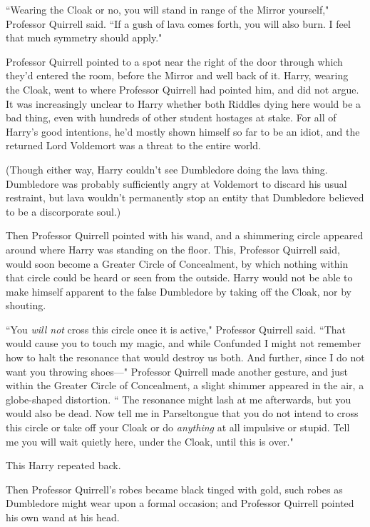 ``Wearing the Cloak or no, you will stand in range of the Mirror yourself," Professor Quirrell said. ``If a gush of lava comes forth, you will also burn. I feel that much symmetry should apply."

Professor Quirrell pointed to a spot near the right of the door through which they'd entered the room, before the Mirror and well back of it. Harry, wearing the Cloak, went to where Professor Quirrell had pointed him, and did not argue. It was increasingly unclear to Harry whether both Riddles dying here would be a bad thing, even with hundreds of other student hostages at stake. For all of Harry's good intentions, he'd mostly shown himself so far to be an idiot, and the returned Lord Voldemort was a threat to the entire world.

(Though either way, Harry couldn't see Dumbledore doing the lava thing. Dumbledore was probably sufficiently angry at Voldemort to discard his usual restraint, but lava wouldn't permanently stop an entity that Dumbledore believed to be a discorporate soul.)

Then Professor Quirrell pointed with his wand, and a shimmering circle appeared around where Harry was standing on the floor. This, Professor Quirrell said, would soon become a Greater Circle of Concealment, by which nothing within that circle could be heard or seen from the outside. Harry would not be able to make himself apparent to the false Dumbledore by taking off the Cloak, nor by shouting.

``You \emph{will not} cross this circle once it is active," Professor Quirrell said. ``That would cause you to touch my magic, and while Confunded I might not remember how to halt the resonance that would destroy us both. And further, since I do not want you throwing shoes---" Professor Quirrell made another gesture, and just within the Greater Circle of Concealment, a slight shimmer appeared in the air, a globe-shaped distortion. `` The resonance might lash at me afterwards, but you would also be dead. Now tell me in Parseltongue that you do not intend to cross this circle or take off your Cloak or do \emph{anything} at all impulsive or stupid. Tell me you will wait quietly here, under the Cloak, until this is over."

This Harry repeated back.

Then Professor Quirrell's robes became black tinged with gold, such robes as Dumbledore might wear upon a formal occasion; and Professor Quirrell pointed his own wand at his head.

